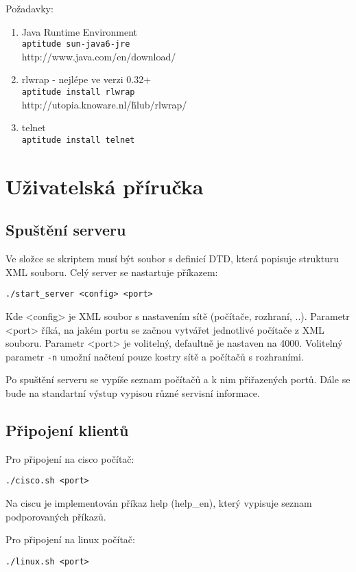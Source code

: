 Požadavky:
\begin{enumerate}
\item Java Runtime Environment\\
      \verb|aptitude sun-java6-jre|\\
      http://www.java.com/en/download/
\item rlwrap - nejlépe ve verzi 0.32+\\
    \verb|aptitude install rlwrap|\\
    http://utopia.knoware.nl/\~hlub/rlwrap/
\item telnet\\
    \verb|aptitude install telnet|
\end{enumerate}





\section{Uživatelská příručka} 

\subsection{Spuštění serveru} 

Ve složce se skriptem musí být soubor s definicí DTD, která popisuje strukturu XML souboru.
Celý server se nastartuje příkazem:
\begin{verbatim}
./start_server <config> <port> 
\end{verbatim} 
Kde <config> je XML soubor s nastavením sítě (počítače, rozhraní, ..).
Parametr <port> říká, na jakém portu se začnou vytvářet jednotlivé počítače z XML souboru.
Parametr <port> je volitelný, defaultně je nastaven na 4000.
Volitelný parametr \verb|-n| umožní načtení pouze kostry sítě a počítačů s rozhraními.

Po spuštění serveru se vypíše seznam počítačů a k nim přiřazených portů.
Dále se bude na standartní výstup vypisou různé servisní informace.

\subsection{Připojení klientů} 
Pro připojení na cisco počítač:
\begin{verbatim}
./cisco.sh <port> 
\end{verbatim} 

Na ciscu je implementován příkaz help (help\_en), který vypisuje seznam podporovaných příkazů.

Pro připojení na linux počítač:
\begin{verbatim}
./linux.sh <port>
\end{verbatim} 

